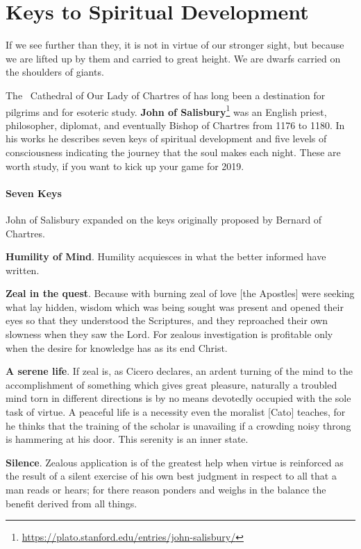 \section{Keys to Spiritual Development}

\begin{quotex}
If we see further than they, it is not in virtue of our stronger sight, but because we are lifted up by them and carried to great height. We are dwarfs carried on the shoulders of giants. 

\end{quotex}
The  Cathedral of Our Lady of Chartres of has long been a destination for pilgrims and for esoteric study. \textbf{John of Salisbury}\footnote{\url{https://plato.stanford.edu/entries/john-salisbury/}} was an English priest, philosopher, diplomat, and eventually Bishop of Chartres from 1176 to 1180. In his works he describes seven keys of spiritual development and five levels of consciousness indicating the journey that the soul makes each night. These are worth study, if you want to kick up your game for 2019.

\paragraph{Seven Keys}
John of Salisbury expanded on the keys originally proposed by Bernard of Chartres.

\textbf{Humility of Mind}. Humility acquiesces in what the better informed have written.

\textbf{Zeal in the quest}. Because with burning zeal of love [the Apostles] were seeking what lay hidden, wisdom which was being sought was present and opened their eyes so that they understood the Scriptures, and they reproached their own slowness when they saw the Lord. For zealous investigation is profitable only when the desire for knowledge has as its end Christ.

\textbf{A serene life}. If zeal is, as Cicero declares, an ardent turning of the mind to the accomplishment of something which gives great pleasure, naturally a troubled mind torn in different directions is by no means devotedly occupied with the sole task of virtue. A peaceful life is a necessity even the moralist [Cato] teaches, for he thinks that the training of the scholar is unavailing if a crowding noisy throng is hammering at his door. This serenity is an inner state.

\textbf{Silence}. Zealous application is of the greatest help when virtue is reinforced as the result of a silent exercise of his own best judgment in respect to all that a man reads or hears; for there reason ponders and weighs in the balance the benefit derived from all things.

